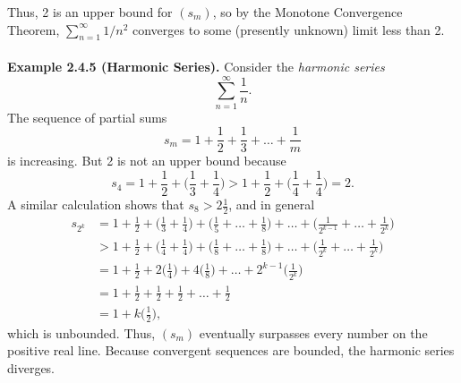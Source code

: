 \documentclass{article}
\begin{document}
                Thus, 2 is an upper bound for $(s_m)$, so by the Monotone Convergence Theorem, $\sum_{n=1}^\infty 1/n^2$ converges to some (presently unknown) limit less than 2.\\ \\
                \textbf{Example 2.4.5 (Harmonic Series).} Consider the \textit{harmonic series}
                \begin{equation*}
                    \sum_{n=1}^\infty \frac{1}{n}.
                \end{equation*}
                The sequence of partial sums 
                \begin{equation*}
                    s_m = 1 + \frac{1}{2} + \frac{1}{3} + \dots + \frac{1}{m}
                \end{equation*}
                is increasing. But 2 is not an upper bound because
                \begin{equation*}
                    s_4 = 1 + \frac{1}{2} + \bigg(\frac{1}{3}+\frac{1}{4}\bigg) > 1 + \frac{1}{2} + \bigg(\frac{1}{4}+\frac{1}{4}\bigg) = 2.
                \end{equation*}
                A similar calculation shows that $s_8 > 2\frac{1}{2}$, and in general
                \begin{align*}
                    s_{2^k} & = 1 + \frac{1}{2} + \bigg(\frac{1}{3}+\frac{1}{4}\bigg) + \bigg(\frac{1}{5}+\dots+\frac{1}{8}\bigg)+ \dots + \bigg(\frac{1}{2^{k-1}}+ \dots + \frac{1}{2^k}\bigg) \\
                    & > 1 + \frac{1}{2} + \bigg(\frac{1}{4}+\frac{1}{4}\bigg) + \bigg(\frac{1}{8}+\dots+\frac{1}{8}\bigg)+ \dots + \bigg(\frac{1}{2^k}+ \dots + \frac{1}{2^k}\bigg) \\
                    & = 1 + \frac{1}{2} + 2\bigg(\frac{1}{4}\bigg) + 4\bigg(\frac{1}{8}\bigg)+ \dots + 2^{k-1}\bigg(\frac{1}{2^k}\bigg) \\
                    & = 1 + \frac{1}{2} + \frac{1}{2} + \frac{1}{2} + \dots + \frac{1}{2} \\
                    & = 1 + k\bigg(\frac{1}{2}\bigg),
                \end{align*}
                which is unbounded. Thus, $(s_m)$ eventually surpasses every number on the positive real line. Because convergent sequences are bounded, the harmonic series diverges.
                \\ \\
\end{document}
